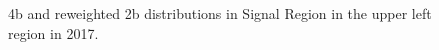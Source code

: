 \begin{figure}[ht]
 
 
    \caption{4b and reweighted 2b distributions in Signal Region in the upper left region in 2017.}
    \label{fig:upper-left-4b-SR-2017}
\end{figure}


